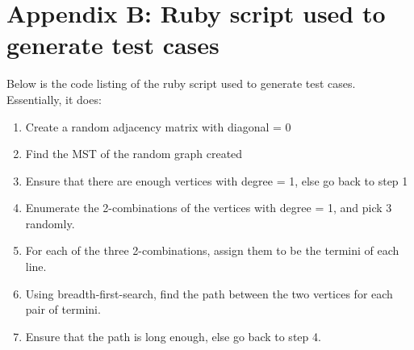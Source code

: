 \documentclass[a4paper,12pt]{article}
\begin{document}
\section*{Appendix B: Ruby script used to generate test cases}
Below is the code listing of the ruby script used to generate test cases. Essentially, it does:
\begin{enumerate}
	\item Create a random adjacency matrix with diagonal = 0
	\item Find the MST of the random graph created
	\item Ensure that there are enough vertices with degree = 1, else go back to step 1
	\item Enumerate the 2-combinations of the vertices with degree = 1, and pick 3 randomly.
	\item For each of the three 2-combinations, assign them to be the termini of each line.
	\item Using breadth-first-search, find the path between the two vertices for each pair of termini.
	\item Ensure that the path is long enough, else go back to step 4.
\end{enumerate}
\end{document}
